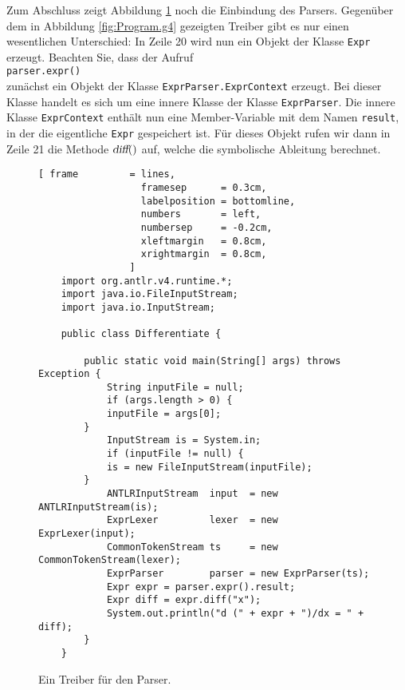 Zum Abschluss zeigt Abbildung \ref{fig:Differentiate.java} noch die Einbindung des Parsers.
Gegen\"uber dem in Abbildung \ref{fig:Program.g4} gezeigten Treiber gibt es nur einen
wesentlichen Unterschied: In Zeile 20 wird nun ein Objekt der Klasse \texttt{Expr} erzeugt.
Beachten Sie, dass der Aufruf
\\[0.2cm]
\hspace*{1.3cm}
\texttt{parser.expr()}
\\[0.2cm]
zun\"achst ein Objekt der Klasse \texttt{ExprParser.ExprContext} erzeugt.  Bei dieser Klasse handelt
es sich um eine innere Klasse der Klasse \texttt{ExprParser}.  Die innere Klasse
\texttt{ExprContext} enth\"alt nun eine Member-Variable mit dem Namen \texttt{result}, in der die
eigentliche \texttt{Expr} gespeichert ist.  
F\"ur dieses Objekt rufen wir dann in Zeile 21 die Methode $\textsl{diff}()$ auf, welche die
symbolische Ableitung berechnet.


\begin{figure}[!ht]
\centering
\begin{Verbatim}[ frame         = lines, 
                  framesep      = 0.3cm, 
                  labelposition = bottomline,
                  numbers       = left,
                  numbersep     = -0.2cm,
                  xleftmargin   = 0.8cm,
                  xrightmargin  = 0.8cm,
                ]
    import org.antlr.v4.runtime.*;
    import java.io.FileInputStream;
    import java.io.InputStream;
    
    public class Differentiate {
    
        public static void main(String[] args) throws Exception {
            String inputFile = null; 
            if (args.length > 0) { 
    	    inputFile = args[0];
    	}
            InputStream is = System.in;
            if (inputFile != null) {
    	    is = new FileInputStream(inputFile);
    	}
            ANTLRInputStream  input  = new ANTLRInputStream(is);
            ExprLexer         lexer  = new ExprLexer(input);
            CommonTokenStream ts     = new CommonTokenStream(lexer);
            ExprParser        parser = new ExprParser(ts);
            Expr expr = parser.expr().result;
            Expr diff = expr.diff("x");
            System.out.println("d (" + expr + ")/dx = " + diff);
        }
    }
\end{Verbatim}
\vspace*{-0.3cm}
\caption{Ein Treiber f\"ur den Parser.}
\label{fig:Differentiate.java}
\end{figure}
\pagebreak


